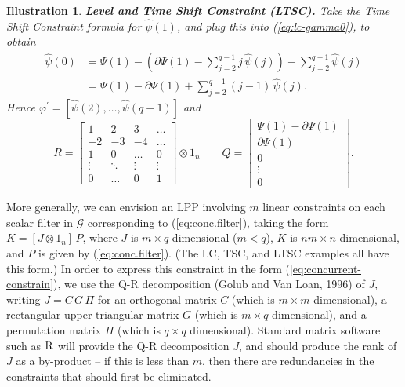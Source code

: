 \documentclass[a4paper]{book}
\newtheorem{Illustration}{Illustration}
\begin{document}
 
\begin{Illustration}  {\bf Level and Time Shift Constraint (LTSC).}  \rm
\label{ill:ltsc}
   Take the Time Shift Constraint formula for $\widehat{\psi} (1)$,
 and plug this into (\ref{eq:lc-gamma0}), to obtain
\begin{align*}
 \widehat{\psi} (0)  & = \Psi (1) - \left( \partial {\Psi} (1)  
 -  \sum_{j=2}^{q-1} j  \, \widehat{\psi} (j) \right) -  \sum_{j=2}^{q-1} 
 \widehat{\psi} (j)  \\
	& = \Psi (1) -  \partial {\Psi} (1)  +  \sum_{j=2}^{q-1} (j-1)  \, \widehat{\psi} (j).
\end{align*}
 Hence  $ \varphi^{\prime}  = [  \widehat{\psi} (2), \ldots, \widehat{\psi} (q-1)  ] $ and
\[
	R  = \left[ \begin{array}{cccc} 1 & 2  &  3  &   \ldots    \\  -2  & -3  &  -4  & \ldots  \\
		 1  & 0 & \ldots & 0 \\ 
		\vdots & \ddots & \vdots & \vdots \\ 0 & \ldots & 0 & 1 \end{array} \right] 
		\otimes 1_n \qquad
	Q = \left[ \begin{array}{c} \Psi (1) - \partial {\Psi} (1)  \\ 
	\partial {\Psi} (1) \\ 0 \\ \vdots \\ 0 \end{array} \right].
\]
\end{Illustration}

 
  More generally, we can envision an LPP involving $m$ linear constraints
 on each scalar filter in $\mathcal{G}$ corresponding to (\ref{eq:conc.filter}),
  taking the form  $   K = [ J \otimes 1_n ] \, P$, where $J$ is $m \times q$ dimensional
 ($m < q$), $K$ is $n m \times n$ dimensional, and $P$ is given by 
  (\ref{eq:conc.filter}).
 (The LC, TSC, and LTSC examples all have this form.) 
 In order to express this constraint in the form 
 (\ref{eq:concurrent-constrain}), we use the Q-R decomposition 
 (Golub and Van Loan, 1996) of $J$, writing
 $J = C \, G \, \Pi$ for an orthogonal matrix $C$ (which is $m \times m$ dimensional), 
 a rectangular upper triangular matrix $G$
 (which is $m \times q$ dimensional), and a permutation matrix 
 $\Pi$ (which is $q \times q$ dimensional).  
 Standard matrix software such as $\textsc{R}$ will provide the Q-R decomposition $J$,
 and should produce the rank of $J$ as  a by-product --
 if this is less than $m$, then there are redundancies in the 
 constraints that should first be eliminated. 
 
\end{document}
